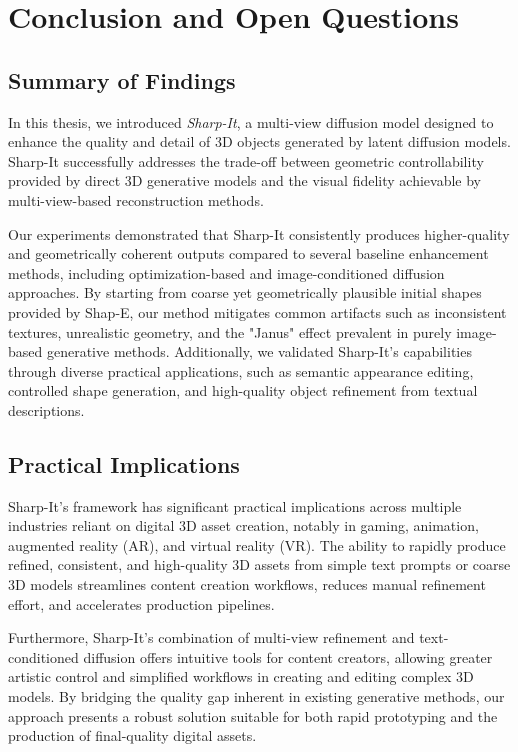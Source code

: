 \chapter{Conclusion and Open Questions}
\label{chap:conclusion}

\section{Summary of Findings}

In this thesis, we introduced \emph{Sharp-It}, a multi-view diffusion model designed to enhance the quality and detail of 3D objects generated by latent diffusion models. Sharp-It successfully addresses the trade-off between geometric controllability provided by direct 3D generative models and the visual fidelity achievable by multi-view-based reconstruction methods.

Our experiments demonstrated that Sharp-It consistently produces higher-quality and geometrically coherent outputs compared to several baseline enhancement methods, including optimization-based and image-conditioned diffusion approaches. By starting from coarse yet geometrically plausible initial shapes provided by Shap-E, our method mitigates common artifacts such as inconsistent textures, unrealistic geometry, and the "Janus" effect prevalent in purely image-based generative methods. Additionally, we validated Sharp-It's capabilities through diverse practical applications, such as semantic appearance editing, controlled shape generation, and high-quality object refinement from textual descriptions.

\section{Practical Implications}

Sharp-It’s framework has significant practical implications across multiple industries reliant on digital 3D asset creation, notably in gaming, animation, augmented reality (AR), and virtual reality (VR). The ability to rapidly produce refined, consistent, and high-quality 3D assets from simple text prompts or coarse 3D models streamlines content creation workflows, reduces manual refinement effort, and accelerates production pipelines.

Furthermore, Sharp-It’s combination of multi-view refinement and text-conditioned diffusion offers intuitive tools for content creators, allowing greater artistic control and simplified workflows in creating and editing complex 3D models. By bridging the quality gap inherent in existing generative methods, our approach presents a robust solution suitable for both rapid prototyping and the production of final-quality digital assets.

